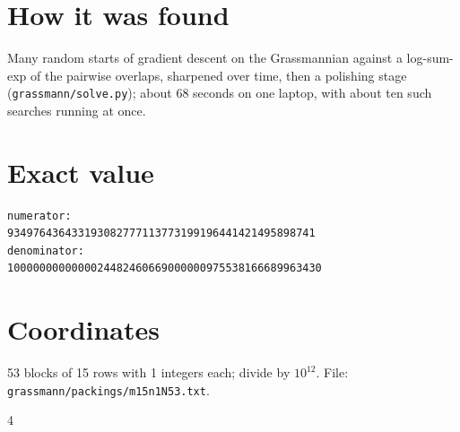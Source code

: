 \documentclass[11pt,a4paper]{article}
\begin{document}
\section{How it was found}
Many random starts of gradient descent on the Grassmannian against a log-sum-exp of the pairwise overlaps, sharpened over time, then a polishing stage (\texttt{grassmann/solve.py}); about 68 seconds on one laptop, with about ten such searches running at once.


\appendix
\section{Exact value}
{\small
\begin{verbatim}
numerator:
934976436433193082777113773199196441421495898741
denominator:
1000000000000024482460669000000975538166689963430
\end{verbatim}}

\section{Coordinates}
53 blocks of 15 rows with 1 integers each; divide by $10^{12}$. File: \texttt{grassmann/packings/m15n1N53.txt}.
{\tiny
\begin{multicols}{4}
\end{multicols}}
\end{document}
